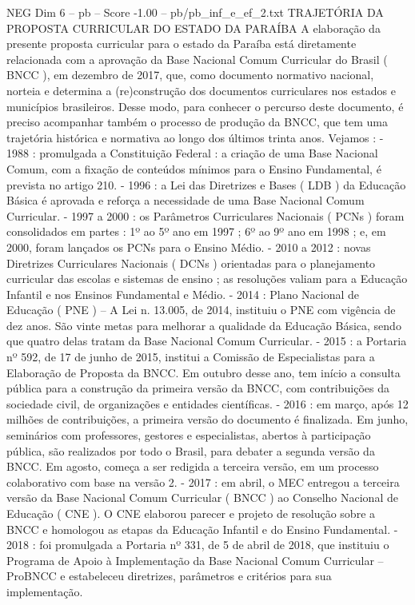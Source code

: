\begin{textsample}{NEG Dim 6 – pb – Score -1.00 – pb/pb\_inf\_e\_ef\_2.txt}  \label{ex:f6_neg_081}
TRAJETÓRIA DA PROPOSTA CURRICULAR DO ESTADO DA PARAÍBA A elaboração da presente proposta curricular para o estado da Paraíba está diretamente relacionada com a aprovação da Base Nacional Comum Curricular do Brasil ( BNCC ), em dezembro de 2017, que, como documento normativo nacional, norteia e determina a (re)construção dos documentos curriculares nos estados e municípios brasileiros.
Desse modo, para conhecer o percurso deste documento, é preciso acompanhar também o processo de produção da BNCC, que tem uma trajetória histórica e normativa ao longo dos últimos trinta anos.
Vejamos : - 1988 : promulgada a Constituição Federal : a criação de uma Base Nacional Comum, com a fixação de conteúdos mínimos para o Ensino Fundamental, é prevista no artigo 210. - 1996 : a Lei das Diretrizes e Bases ( LDB ) da Educação Básica é aprovada e reforça a necessidade de uma Base Nacional Comum Curricular. - 1997 a 2000 : os Parâmetros Curriculares Nacionais ( PCNs ) foram consolidados em partes : 1º ao 5º ano em 1997 ; 6º ao 9º ano em 1998 ; e, em 2000, foram lançados os PCNs para o Ensino Médio. - 2010 a 2012 : novas Diretrizes Curriculares Nacionais ( DCNs ) orientadas para o planejamento curricular das escolas e sistemas de ensino ; as resoluções valiam para a Educação Infantil e nos Ensinos Fundamental e Médio. - 2014 : Plano Nacional de Educação ( PNE ) – A Lei n. 13.005, de 2014, instituiu o PNE com vigência de dez anos.
São vinte metas para melhorar a qualidade da Educação Básica, sendo que quatro delas tratam da Base Nacional Comum Curricular. - 2015 : a Portaria nº 592, de 17 de junho de 2015, institui a Comissão de Especialistas para a Elaboração de Proposta da BNCC.
Em outubro desse ano, tem início a consulta pública para a construção da primeira versão da BNCC, com contribuições da sociedade civil, de organizações e entidades científicas. - 2016 : em março, após 12 milhões de contribuições, a primeira versão do documento é finalizada.
Em junho, seminários com professores, gestores e especialistas, abertos à participação pública, são realizados por todo o Brasil, para debater a segunda versão da BNCC.
Em agosto, começa a ser redigida a terceira versão, em um processo colaborativo com base na versão 2. - 2017 : em abril, o MEC entregou a terceira versão da Base Nacional Comum Curricular ( BNCC ) ao Conselho Nacional de Educação ( CNE ).
O CNE elaborou parecer e projeto de resolução sobre a BNCC e homologou as etapas da Educação Infantil e do Ensino Fundamental. - 2018 : foi promulgada a Portaria nº 331, de 5 de abril de 2018, que instituiu o Programa de Apoio à Implementação da Base Nacional Comum Curricular – ProBNCC e estabeleceu diretrizes, parâmetros e critérios para sua implementação.

\end{textsample}
